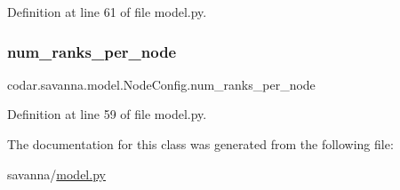 Definition at line 61 of file model.\+py.

\mbox{\label{classcodar_1_1savanna_1_1model_1_1_node_config_abfaac776b1cc5d4b0e6b3dd9d57a32be}} 
\subsubsection{\texorpdfstring{num\+\_\+ranks\+\_\+per\+\_\+node}{num\_ranks\_per\_node}}
{\footnotesize\ttfamily codar.\+savanna.\+model.\+Node\+Config.\+num\+\_\+ranks\+\_\+per\+\_\+node}



Definition at line 59 of file model.\+py.



The documentation for this class was generated from the following file\+:\begin{DoxyCompactItemize}
\item 
savanna/\hyperlink{savanna_2model_8py}{model.\+py}\end{DoxyCompactItemize}
